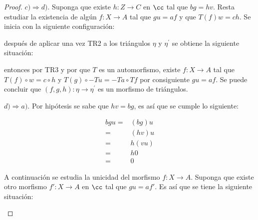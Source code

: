 \documentclass{article}
\begin{document}
\begin{enumerate}[label=\textbf{Ej \arabic*.}]
\begin{proof}
			\bigskip
			
			$c) \Rightarrow d)$. Suponga que existe $h:Z\to C$ en $\cc$ tal que $bg=hv$. Resta estudiar la existencia de alg\'un $f:X\to A$ tal que $gu=af$ y que $T(f)w=ch$. Se inicia con la siguiente configuración:
			
			\begin{center}
			\end{center}
			después de aplicar una vez TR2 a los triángulos $\eta$ y $\eta^{'}$ se obtiene la siguiente situación:
			
			\begin{center}
			\end{center}
			entonces por TR3 y por que $T$ es un automorfismo, existe $f:X\to A$ tal que $T(f)\circ w=c\circ h$ y $T(g)\circ -Tu=-Ta\circ Tf$ por consiguiente $gu=af$. Se puede concluir que $(f,g,h):\eta \to \eta^{'}$ es un morfismo de triángulos.
			
			\bigskip
			
			$d) \Rightarrow a)$. Por hipótesis se sabe que $hv=bg$, es así que se cumple lo siguiente:
			
			\begin{align*}
				bgu =& (bg)u\\
				=& (hv)u\\
				=& h(vu)\\
				=& h0\\
				=& 0
			\end{align*}
			
			A continuación se estudia la unicidad del morfismo $f:X\to A$. Suponga que existe otro morfismo $f':X\to A$ en $\cc$ tal que $gu=af'$. Es así que se tiene la siguiente situación:
			
			\begin{center}
			\end{center}
			

\end{proof}
\end{enumerate}
\end{document}
